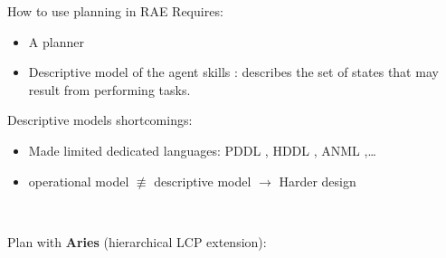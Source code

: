 \begin{frame}{How to use planning in RAE}
    Requires:
    \begin{itemize}
        \item A planner
        \item Descriptive model of the agent skills : describes the set of states that may result from performing tasks.
    \end{itemize} 
\pause
    Descriptive models shortcomings:
    \begin{itemize}
        \item Made limited dedicated languages: PDDL \cite{foxPDDL2ExtensionPDDL2003}, HDDL \cite{hollerHDDLExtensionPDDL2020}, ANML \cite{smith2008anml},\dots
        \item operational model $\not\equiv$ descriptive model $\rightarrow$ Harder design
    \end{itemize}

    ~
    \pause
    \centering

    \pause
    Plan with \textbf{Aries} (hierarchical LCP\cite{bit-monnotConstraintBasedEncodingDomainIndependent2018} extension):

\end{frame}

